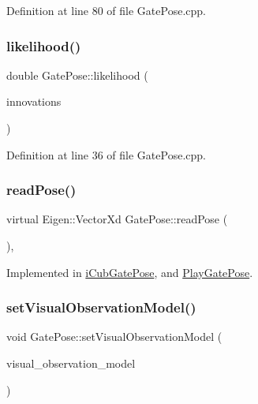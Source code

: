 Definition at line 80 of file Gate\+Pose.\+cpp.

\mbox{\label{classGatePose_a939c575d5d59c8b0f3ab528edd368c0d}} 
\subsubsection{\texorpdfstring{likelihood()}{likelihood()}}
{\footnotesize\ttfamily double Gate\+Pose\+::likelihood (\begin{DoxyParamCaption}\item[{const Eigen\+::\+Ref$<$ const Eigen\+::\+Matrix\+Xf $>$ \&}]{innovations }\end{DoxyParamCaption})\hspace{0.3cm}{\ttfamily [override]}}



Definition at line 36 of file Gate\+Pose.\+cpp.

\mbox{\label{classGatePose_aed9235df850c3ca930f9e43276bf4f62}} 
\subsubsection{\texorpdfstring{read\+Pose()}{readPose()}}
{\footnotesize\ttfamily virtual Eigen\+::\+Vector\+Xd Gate\+Pose\+::read\+Pose (\begin{DoxyParamCaption}{ }\end{DoxyParamCaption})\hspace{0.3cm}{\ttfamily [protected]}, {}}



Implemented in \hyperlink{classiCubGatePose_aff1494edcf8f17803788f954ba0b443b}{i\+Cub\+Gate\+Pose}, and \hyperlink{classPlayGatePose_a863afa00ea83395e7f2ceffd26242106}{Play\+Gate\+Pose}.

\mbox{\label{classGatePose_a18ba358c801ae1a246dbee2f9780c698}} 
\subsubsection{\texorpdfstring{set\+Visual\+Observation\+Model()}{setVisualObservationModel()}}
{\footnotesize\ttfamily void Gate\+Pose\+::set\+Visual\+Observation\+Model (\begin{DoxyParamCaption}\item[{std\+::unique\+\_\+ptr$<$ bfl\+::\+Visual\+Observation\+Model $>$}]{visual\+\_\+observation\+\_\+model }\end{DoxyParamCaption})\hspace{0.3cm}{\ttfamily [override]}}



